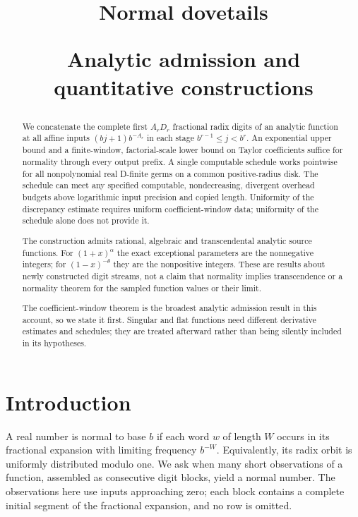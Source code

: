 \documentclass[11pt,a4paper]{article}
\title{\vspace{-1.5em}\LARGE\bfseries Normal dovetails\par\vspace{0.35em}\large Analytic admission and quantitative constructions}
\author{}
\date{}
\begin{document}
\maketitle
\vspace{-3em}
\begin{abstract}

We concatenate the complete first $A_rD_r$ fractional radix digits of an analytic function at all affine inputs $(bj+1)b^{-A_r}$ in each stage $b^{r-1}\le j< b^r$. An exponential upper bound and a finite-window, factorial-scale lower bound on Taylor coefficients suffice for normality through every output prefix. A single computable schedule works pointwise for all nonpolynomial real D-finite germs on a common positive-radius disk. The schedule can meet any specified computable, nondecreasing, divergent overhead budgets above logarithmic input precision and copied length. Uniformity of the discrepancy estimate requires uniform coefficient-window data; uniformity of the schedule alone does not provide it.

The construction admits rational, algebraic and transcendental analytic source functions. For $(1+x)^\alpha$ the exact exceptional parameters are the nonnegative integers; for $(1-x)^{-\theta}$ they are the nonpositive integers. These are results about newly constructed digit streams, not a claim that normality implies transcendence or a normality theorem for the sampled function values or their limit.

The coefficient-window theorem is the broadest analytic admission result in this account, so we state it first. Singular and flat functions need different derivative estimates and schedules; they are treated afterward rather than being silently included in its hypotheses.

\end{abstract}
\vspace{1em}
\tableofcontents
\newpage

\section*{Introduction}

A real number is normal to base \(b\) if each word \(w\) of length \(W\)
occurs in its fractional expansion with limiting frequency \(b^{-W}\).
Equivalently, its radix orbit is uniformly distributed modulo one. We
ask when many short observations of a function, assembled as consecutive
digit blocks, yield a normal number. The observations here use inputs
approaching zero; each block contains a complete initial segment of the
fractional expansion, and no row is omitted.
\end{document}
